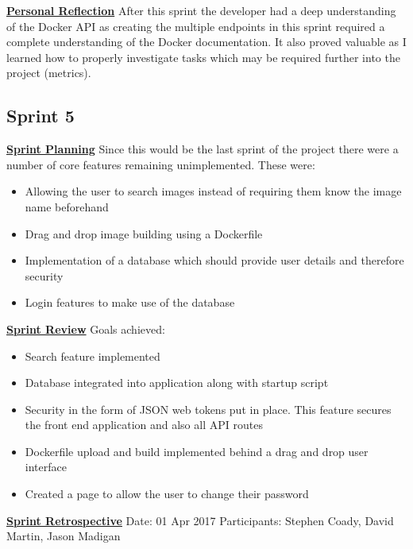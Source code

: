 \underline{\textbf{Personal Reflection}}\newline
After this sprint the developer had a deep understanding of the Docker API as creating the multiple endpoints in this sprint required a complete understanding of the Docker documentation. It also proved valuable as I learned how to properly investigate tasks which may be required further into the project (metrics).

\subsection{Sprint 5}

\underline{\textbf{Sprint Planning}}\newline
Since this would be the last sprint of the project there were a number of core features remaining unimplemented. These were:
\begin{itemize}
	\item Allowing the user to search images instead of requiring them know the image name beforehand
	\item Drag and drop image building using a \gls{Dockerfile}
	\item Implementation of a database which should provide user details and therefore security
	\item Login features to make use of the database
\end{itemize}

\underline{\textbf{Sprint Review}}\newline
Goals achieved:
\begin{itemize}
	\item Search feature implemented
	\item Database integrated into application along with startup script
	\item Security in the form of JSON web tokens put in place. This feature secures the front end application and also all API routes
	\item Dockerfile upload and build implemented behind a drag and drop user interface
	\item Created a page to allow the user to change their password
\end{itemize}

\underline{\textbf{Sprint Retrospective}}\newline
Date: 01 Apr 2017
Participants: Stephen Coady, David Martin, Jason Madigan

